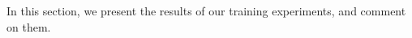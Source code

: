 \label{07_results_and_discussion}


In this section, we present the results of our training experiments, and comment on them.

